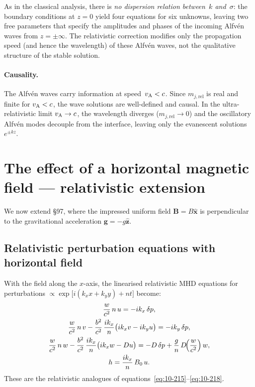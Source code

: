 As in the classical analysis, there is \emph{no dispersion relation
between~$k$ and~$\sigma$}: the boundary conditions at $z=0$ yield four
equations for six unknowns, leaving two free parameters that specify the
amplitudes and phases of the incoming Alfv\'en waves from $z=\pm\infty$.
The relativistic correction modifies only the propagation speed (and
hence the wavelength) of these Alfv\'en waves, not the qualitative
structure of the stable solution.

\paragraph{Causality.}
The Alfv\'en waves carry information at speed~$v_{\mathrm{A}}<c$.  Since
$m_{j,\text{rel}}$ is real and finite for $v_{\mathrm{A}}<c$, the wave solutions
are well-defined and causal.  In the ultra-relativistic limit
$v_{\mathrm{A}}\to c$, the wavelength diverges ($m_{j,\text{rel}}\to0$) and the
oscillatory Alfv\'en modes decouple from the interface, leaving only the
evanescent solutions $e^{\pm kz}$.

\section{The effect of a horizontal magnetic field --- relativistic
  extension}\label{sec:rel-97}

We now extend \S97, where the impressed uniform field
$\mathbf{B}=B\hat{\mathbf{x}}$ is perpendicular to the gravitational
acceleration $\mathbf{g}=-g\hat{\mathbf{z}}$.

\subsection{Relativistic perturbation equations with horizontal field}

With the field along the $x$-axis, the linearised relativistic MHD
equations for perturbations
$\propto\exp\!\bigl[i(k_{x}x+k_{y}y)+nt\bigr]$ become:
\begin{gather}
  \frac{w}{c^{2}}\,n\,u
    = -ik_{x}\,\delta p,
  \label{eq:rel97-x}\\
  \frac{w}{c^{2}}\,n\,v
    - \frac{b^{2}}{c^{2}}\,\frac{ik_{x}}{n}
      \bigl(ik_{x}v-ik_{y}u\bigr)
    = -ik_{y}\,\delta p,
  \label{eq:rel97-y}\\
  \frac{w}{c^{2}}\,n\,w
    - \frac{b^{2}}{c^{2}}\,\frac{ik_{x}}{n}
      \bigl(ik_{x}w-Du\bigr)
    = -D\,\delta p
      + \frac{g}{n}\,D\!\Bigl(\frac{w}{c^{2}}\Bigr)\,w,
  \label{eq:rel97-z}\\
  h = \frac{ik_{x}}{n}\,B_{0}\,u.
  \label{eq:rel97-h}
\end{gather}
These are the relativistic analogues of
equations~\eqref{eq:10-215}--\eqref{eq:10-218}.

